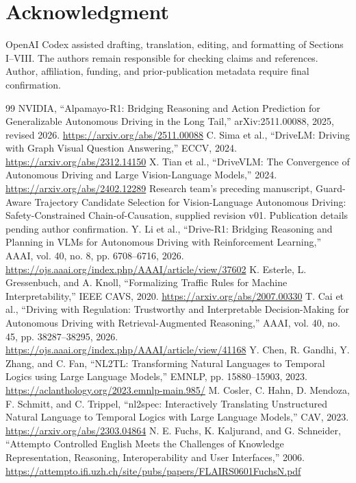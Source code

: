 \documentclass[nolineno]{ieeeaccess}
\begin{document}
\section*{Acknowledgment}
OpenAI Codex assisted drafting, translation, editing, and formatting of Sections I--VIII. The authors remain responsible for checking claims and references. Author, affiliation, funding, and prior-publication metadata require final confirmation.\cite{r15}
\begin{thebibliography}{99}
 NVIDIA, “Alpamayo-R1: Bridging Reasoning and Action Prediction for Generalizable Autonomous Driving in the Long Tail,” arXiv:2511.00088, 2025, revised 2026. \url{https://arxiv.org/abs/2511.00088}
 C. Sima et al., “DriveLM: Driving with Graph Visual Question Answering,” ECCV, 2024. \url{https://arxiv.org/abs/2312.14150}
 X. Tian et al., “DriveVLM: The Convergence of Autonomous Driving and Large Vision-Language Models,” 2024. \url{https://arxiv.org/abs/2402.12289}
 Research team's preceding manuscript, Guard-Aware Trajectory Candidate Selection for Vision-Language Autonomous Driving: Safety-Constrained Chain-of-Causation, supplied revision v01. Publication details pending author confirmation.
 Y. Li et al., “Drive-R1: Bridging Reasoning and Planning in VLMs for Autonomous Driving with Reinforcement Learning,” AAAI, vol. 40, no. 8, pp. 6708--6716, 2026. \url{https://ojs.aaai.org/index.php/AAAI/article/view/37602}
 K. Esterle, L. Gressenbuch, and A. Knoll, “Formalizing Traffic Rules for Machine Interpretability,” IEEE CAVS, 2020. \url{https://arxiv.org/abs/2007.00330}
 T. Cai et al., “Driving with Regulation: Trustworthy and Interpretable Decision-Making for Autonomous Driving with Retrieval-Augmented Reasoning,” AAAI, vol. 40, no. 45, pp. 38287--38295, 2026. \url{https://ojs.aaai.org/index.php/AAAI/article/view/41168}
 Y. Chen, R. Gandhi, Y. Zhang, and C. Fan, “NL2TL: Transforming Natural Languages to Temporal Logics using Large Language Models,” EMNLP, pp. 15880--15903, 2023. \url{https://aclanthology.org/2023.emnlp-main.985/}
 M. Cosler, C. Hahn, D. Mendoza, F. Schmitt, and C. Trippel, “nl2spec: Interactively Translating Unstructured Natural Language to Temporal Logics with Large Language Models,” CAV, 2023. \url{https://arxiv.org/abs/2303.04864}
 N. E. Fuchs, K. Kaljurand, and G. Schneider, “Attempto Controlled English Meets the Challenges of Knowledge Representation, Reasoning, Interoperability and User Interfaces,” 2006. \url{https://attempto.ifi.uzh.ch/site/pubs/papers/FLAIRS0601FuchsN.pdf}

\end{thebibliography}
\end{document}
